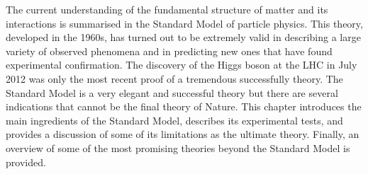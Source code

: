 The current understanding of the fundamental structure of matter and its interactions is summarised in the Standard Model of particle physics. This theory, developed in the 1960s, has turned out to be extremely valid in describing a large variety of observed phenomena and in predicting new ones that have found experimental confirmation. The discovery of the Higgs boson at the LHC in July 2012 was only the most recent proof of a tremendous successfully theory. The Standard Model is a very elegant and successful theory but there are several indications that cannot be the final theory of Nature. This chapter introduces the main ingredients of the Standard Model, describes its experimental tests, and provides a discussion of some of its limitations as the ultimate theory. Finally, an overview of some of the most promising theories beyond the Standard Model is provided.